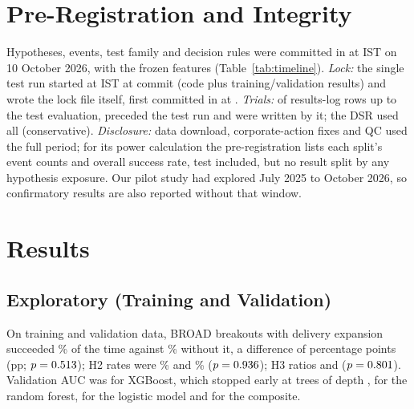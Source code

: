 \documentclass[conference]{IEEEtran}
\begin{document}
\section{Pre-Registration and Integrity}\label{sec:prereg}
Hypotheses, events, test family and decision rules were committed in \texttt{\PreregCommit} at \PreregTime{}
IST on 10 October 2026, with the frozen features (Table~\ref{tab:timeline}). \emph{Lock:} the single test run
started at \LockStart{} IST at commit \texttt{\LockHead} (code plus training/validation results) and wrote the
lock file itself, first committed in \texttt{\LockCommit} at \LockCommitTime. \emph{Trials:} of
\TrialsThroughPSix{} results-log rows up to the test evaluation, \TrialsBefore{} preceded the test run and
\TrialsTestRun{} were written by it; the DSR used all \DSRtrials{} (conservative). \emph{Disclosure:} data
download, corporate-action fixes and QC used the full period; for its power calculation the pre-registration
lists each split's event counts and overall success rate, test included, but no result split by any
hypothesis exposure. Our pilot study had explored July 2025 to October 2026, so confirmatory results are also
reported without that window.



\section{Results}
\subsection{Exploratory (Training and Validation)}
On training and validation data, BROAD breakouts with delivery expansion succeeded \TvHOneExp\% of the time
against \TvHOneRest\% without it, a difference of \TvHOneDiff{} percentage points (pp; $p=0.513$); H2 rates were \TvHTwoExp\% and
\TvHTwoRest\% ($p=0.936$); H3 ratios \TvHThreeExp{} and \TvHThreeRest{} ($p=0.801$). Validation AUC
was \ValAUCxgb{} for XGBoost, which stopped early at \XgbTrees{} trees of depth \XgbDepth, \ValAUCrf{} for the
random forest, \ValAUClogit{} for the logistic model and \ValAUCcomp{} for the composite.
\end{document}
